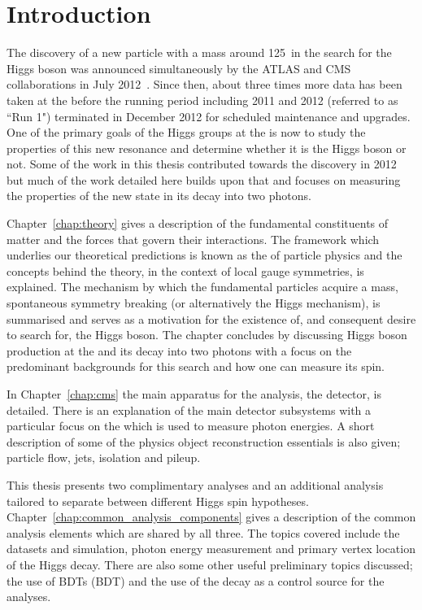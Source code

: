 \chapter{Introduction}
\label{chap:intro}

The discovery of a new particle with a mass around 125~\GeV in the search for the \SM Higgs boson was announced simultaneously by the ATLAS and CMS collaborations in July 2012~\cite{ATLASDiscovery,CMSDiscovery}. Since then, about three times more data has been taken at the \LHC before the running period including 2011 and 2012 (referred to as ``Run 1") terminated in December 2012 for scheduled maintenance and upgrades. One of the primary goals of the Higgs groups at the \LHC is now to study the properties of this new resonance and determine whether it is the \SM Higgs boson or not. Some of the work in this thesis contributed towards the discovery in 2012 but much of the work detailed here builds upon that and focuses on measuring the properties of the new state in its decay into two photons. 

Chapter~\ref{chap:theory} gives a description of the fundamental constituents of matter and the forces that govern their interactions. The framework which underlies our theoretical predictions is known as the \SM of particle physics and the concepts behind the theory, in the context of local gauge symmetries, is explained. The mechanism by which the fundamental particles acquire a mass, spontaneous symmetry breaking (or alternatively the Higgs mechanism), is summarised and serves as a motivation for the existence of, and consequent desire to search for, the Higgs boson. The chapter concludes by discussing Higgs boson production at the \LHC and its decay into two photons with a focus on the predominant backgrounds for this search and how one can measure its spin.

In Chapter~\ref{chap:cms} the main apparatus for the analysis, the \CMS detector, is detailed. There is an explanation of the main detector subsystems with a particular focus on the \ECAL which is used to measure photon energies. A short description of some of the physics object reconstruction essentials is also given; particle flow, jets, isolation and pileup.

This thesis presents two complimentary analyses and an additional analysis tailored to separate between different Higgs spin hypotheses. Chapter~\ref{chap:common_analysis_components} gives a description of the common analysis elements which are shared by all three. The topics covered include the datasets and \MC simulation, photon energy measurement and primary vertex location of the Higgs decay. There are also some other useful preliminary topics discussed; the use of \aclp{BDT} (\acs{BDT}) and the use of the \Zee decay as a control source for the \Hgg analyses.

